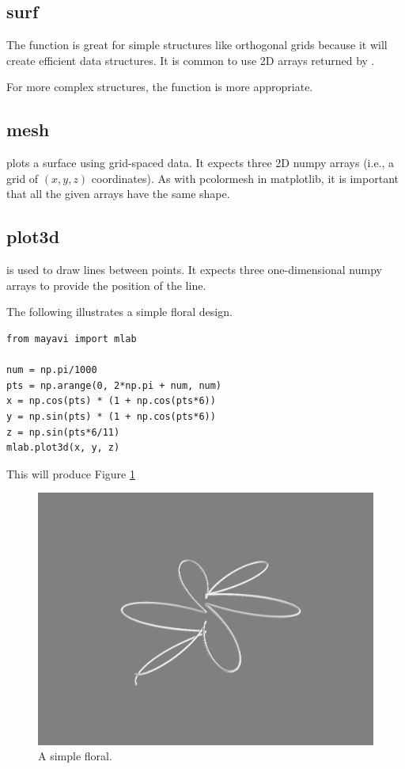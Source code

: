 \subsection*{surf}
The  function is great for simple structures like orthogonal grids 
because it will create efficient data structures. 
It is common to use 2D arrays returned by . 

For more complex structures, the  function is more appropriate. 

\subsection*{mesh}
 plots a surface using grid-spaced data. 
It expects three 2D numpy arrays (i.e., a grid of $(x,y,z)$ coordinates). As with pcolormesh in matplotlib, it is important that 
all the given arrays have the same shape. 

\subsection*{plot3d}
 is used to draw lines between points. It expects three one-dimensional numpy 
arrays to provide the position of the line. 


The following illustrates a simple floral design.
\begin{lstlisting}
from mayavi import mlab

num = np.pi/1000
pts = np.arange(0, 2*np.pi + num, num)
x = np.cos(pts) * (1 + np.cos(pts*6))
y = np.sin(pts) * (1 + np.cos(pts*6))
z = np.sin(pts*6/11)
mlab.plot3d(x, y, z)
\end{lstlisting}
This will produce Figure \ref{fig:plot3d}
\begin{figure} 
\includegraphics[width=\textwidth]{plot3d.png}
\caption{A simple floral.} 
\label{fig:plot3d}
\end{figure}


